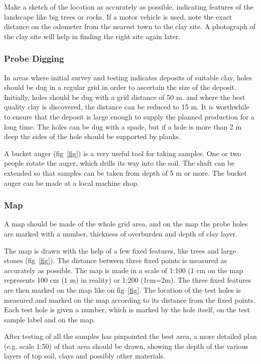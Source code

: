 Make a sketch of the location as accurately as possible, indicating features of 
the landscape like big trees or rocks. If a motor vehicle is used, note the 
exact distance on the odometer from the nearest town to the clay site. A 
photograph of the clay site will help in finding the right site again later.
\subsubsection{Probe Digging}
In areas where initial survey and testing indicates deposits of suitable clay, 
holes should be dug in a regular grid in order to ascertain the size of the 
deposit. Initially, holes should be dug with a grid distance of 50 m. and where 
the best quality clay is discovered, the distance can be reduced to 15 m. It is 
worthwhile to ensure that the deposit is large enough to supply the planned 
production for a long time. The holes can be dug with a spade, but if a hole is 
more than 2 m deep the sides of the hole should be supported by planks.

A bucket auger (fig~\ref{fig}) is a very useful tool for taking samples. One or 
two people rotate the auger, which drills its way into the soil. The shaft can 
be extended so that samples can be taken from depth of 5 m or more. The bucket 
auger can be made at a local machine shop.
\subsubsection{Map}
A map should be made of the whole grid area, and on the map the probe holes are 
marked with a number, thickness of overburden and depth of clay layer.

The map is drawn with the help of a few fixed features, like trees and large 
stones (fig~\ref{fig}). The distance between three fixed points is measured as 
accurately as possible. The map is made in a scale of 1:100 (1 cm on the map 
represents 100 cm (1 m) in reality) or 1:200 (1cm=2m). The three fixed features 
are then marked on the map like on fig~\ref{fig}. The location of the test 
holes is measured and marked on the map according to its distance from the 
fixed points. Each test hole is given a number, which is marked by the hole 
itself, on the test sample label and on the map.

After testing of all the samples has pinpointed the best area, a more detailed 
plan (e.g. scale 1:50) of that area should be drawn, showing the depth of the 
various layers of top soil, clays and possibly other materials.
